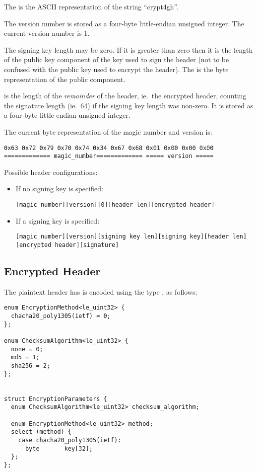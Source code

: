 The  is the ASCII representation of the string ``crypt4gh''.

The version number is stored as a four-byte little-endian unsigned integer.
%
The current version number is 1.

The signing key length may be zero.
%
If it is greater than zero then it is the length of the public key
component of the key used to sign the header (not to be confused with
the public key used to encrypt the header).
%
The  is the byte representation of the public
component.

 is the length of the \emph{remainder} of the header,
ie.\ the encrypted header, counting the signature length (ie.\ 64) if
the signing key length was non-zero.
%
It is stored as a four-byte little-endian unsigned integer.

The current byte representation of the magic number and version is:
\begin{verbatim}
0x63 0x72 0x79 0x70 0x74 0x34 0x67 0x68 0x01 0x00 0x00 0x00
============= magic_number============= ===== version =====
\end{verbatim}

Possible header configurations:
%
\begin{itemize}
%
\item If no signing key is specified:
\begin{verbatim}
[magic number][version][0][header len][encrypted header]
\end{verbatim}
%
\item If a signing key is specified:
\begin{verbatim}
[magic number][version][signing key len][signing key][header len][encrypted header][signature]
\end{verbatim}
%
\end{itemize}


\subsection{Encrypted Header}\label{encrypted:header}
%

The plaintext header has is encoded using the type
, as follows:

\begin{verbatim}
enum EncryptionMethod<le_uint32> {
  chacha20_poly1305(ietf) = 0;
};

enum ChecksumAlgorithm<le_uint32> {
  none = 0;
  md5 = 1;
  sha256 = 2;
};


struct EncryptionParameters {
  enum ChecksumAlgorithm<le_uint32> checksum_algorithm;

  enum EncryptionMethod<le_uint32> method;
  select (method) {
    case chacha20_poly1305(ietf):
      byte       key[32];
  };
};
\end{verbatim}

